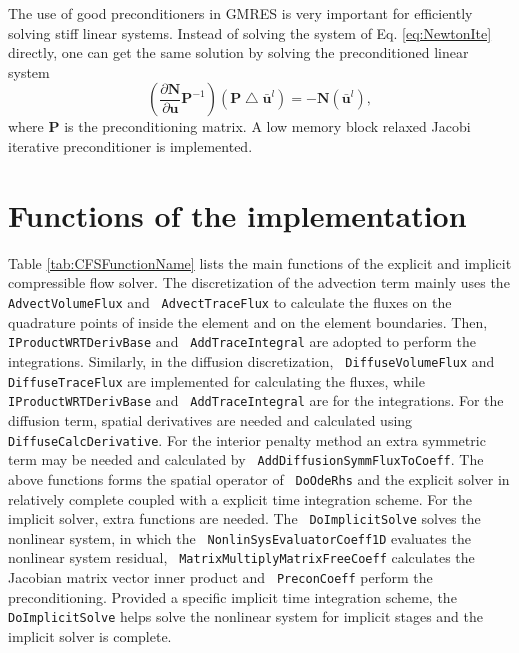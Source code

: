       The use of good preconditioners in GMRES is very important for efficiently solving stiff linear systems. Instead of solving the system of Eq. \eqref{eq:NewtonIte} directly, one can get the same solution by solving the preconditioned linear system
      \begin{equation}
          \left(\frac{\partial\mathbf{N}}{\partial\mathbf{u}}\mathbf{P}^{-1}\right)\left(\mathbf{P}\bigtriangleup\bar{\mathbf{u}}^{l}\right)=-\mathbf{N}\left(\bar{\mathbf{u}}^{l}\right),\label{eq:preconditioning}
      \end{equation}
      where $\mathbf{P}$ is the preconditioning matrix. A low memory block relaxed Jacobi iterative preconditioner is implemented.


  \section{Functions of the implementation}
    
    Table \ref{tab:CFSFunctionName} lists the 
    main functions of the explicit and implicit compressible flow solver. 
    The discretization of the advection term mainly uses the \texttt{ AdvectVolumeFlux} and 
    \texttt{ AdvectTraceFlux} to calculate the fluxes on the quadrature points of inside the element and on the element boundaries. 
    Then, \texttt{ IProductWRTDerivBase} and \texttt{ AddTraceIntegral} are adopted to perform the integrations. 
    Similarly, in the diffusion discretization, \texttt{ DiffuseVolumeFlux} and \texttt{ DiffuseTraceFlux} are implemented for calculating the fluxes, while \texttt{ IProductWRTDerivBase} and \texttt{ AddTraceIntegral} are for the integrations. For the diffusion term, spatial derivatives are needed and calculated using \texttt{ DiffuseCalcDerivative}. For the interior penalty method an extra symmetric term may be needed and calculated by \texttt{ AddDiffusionSymmFluxToCoeff}. The above functions forms the spatial operator of \texttt{ DoOdeRhs} and the explicit solver in relatively complete coupled with a explicit time integration scheme. For the implicit solver, extra functions are needed. The \texttt{ DoImplicitSolve} solves the nonlinear system, in which the \texttt{ NonlinSysEvaluatorCoeff1D} evaluates the nonlinear system residual, \texttt{ MatrixMultiplyMatrixFreeCoeff} calculates the Jacobian matrix vector inner product and \texttt{ PreconCoeff} perform the preconditioning. Provided a specific implicit time integration scheme, the \texttt{ DoImplicitSolve} helps solve the nonlinear system for implicit stages and the implicit solver is complete.
   
